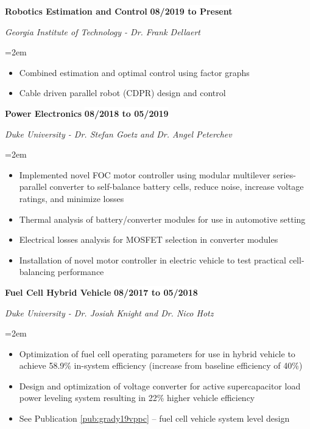 \documentclass[paper=letter,fontsize=11pt]{scrartcl} %
\newcommand{\sepspace}{\vspace*{0em}}		%
\newcommand{\EducationEntry}[4]{
		\noindent \textbf{#1} \hfill      %
		\colorbox{White}{%
			\bf 
			\parbox{10em}{%
			\hfill\color{Black}#2}} \par  %
		\noindent \textit{#3} \par        %
		\noindent\hangindent=2em\hangafter=0 \small #4 %
		\normalsize \par}
\newcommand{\WorkEntry}[4]{				  %
		\noindent \textbf{#1} \hfill      %
		\colorbox{White}{\bf \color{Black}#2} \par  %
		\noindent \textit{#3} \par              %
		\noindent\hangindent=2em\hangafter=0 \small #4 %
		\normalsize \par}
\begin{document}
\WorkEntry{Robotics Estimation and Control}{08/2019 to Present}{Georgia Institute of Technology - Dr. Frank Dellaert}{
	\begin{itemize}
		\item Combined estimation and optimal control using factor graphs
		\item Cable driven parallel robot (CDPR) design and control
	\end{itemize}
}
\sepspace

\WorkEntry{Power Electronics}{08/2018 to 05/2019}{Duke University - Dr. Stefan Goetz and Dr. Angel Peterchev}{
	\begin{itemize}
		\item Implemented novel FOC motor controller using modular multilever series-parallel converter to self-balance battery cells, reduce noise, increase voltage ratings, and minimize losses
		\item Thermal analysis of battery/converter modules for use in automotive setting
		\item Electrical losses analysis for MOSFET selection in converter modules
		\item Installation of novel motor controller in electric vehicle to test practical cell-balancing performance
	\end{itemize}
}
\sepspace

\WorkEntry{Fuel Cell Hybrid Vehicle}{08/2017 to 05/2018}{Duke University - Dr. Josiah Knight and Dr. Nico Hotz}{
	\begin{itemize}
		\item Optimization of fuel cell operating parameters for use in hybrid vehicle to achieve 58.9\% in-system efficiency (increase from baseline efficiency of 40\%)
		\item Design and optimization of voltage converter for active supercapacitor load power leveling system resulting in 22\% higher vehicle efficiency
		\item See Publication \ref{pub:grady19vppc} -- fuel cell vehicle system level design %
	\end{itemize}
}
\sepspace
\end{document}
